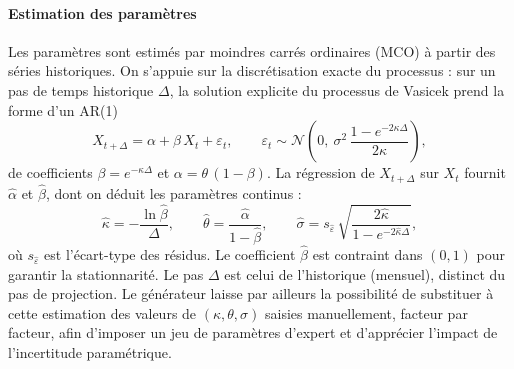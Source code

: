 \paragraph{Estimation des paramètres}
Les paramètres sont estimés par moindres carrés ordinaires (MCO) à partir des séries historiques. On s'appuie sur la discrétisation exacte du processus : sur un pas de temps historique $\Delta$, la solution explicite du processus de Vasicek prend la forme d'un AR(1)
\begin{equation}
    X_{t+\Delta} = \alpha + \beta\, X_t + \varepsilon_t,
    \qquad
    \varepsilon_t \sim \mathcal{N}\!\left(0,\ \sigma^2\,\frac{1-e^{-2\kappa\Delta}}{2\kappa}\right),
\end{equation}
de coefficients $\beta = e^{-\kappa\Delta}$ et $\alpha = \theta\,(1-\beta)$. La régression de $X_{t+\Delta}$ sur $X_t$ fournit $\hat{\alpha}$ et $\hat{\beta}$, dont on déduit les paramètres continus :
\begin{equation}
    \hat{\kappa} = -\frac{\ln\hat{\beta}}{\Delta},
    \qquad
    \hat{\theta} = \frac{\hat{\alpha}}{1-\hat{\beta}},
    \qquad
    \hat{\sigma} = s_{\hat{\varepsilon}}\,\sqrt{\frac{2\hat{\kappa}}{1-e^{-2\hat{\kappa}\Delta}}},
\end{equation}
où $s_{\hat{\varepsilon}}$ est l'écart-type des résidus. Le coefficient $\hat{\beta}$ est contraint dans $(0,1)$ pour garantir la stationnarité. Le pas $\Delta$ est celui de l'historique (mensuel), distinct du pas de projection. Le générateur laisse par ailleurs la possibilité de substituer à cette estimation des valeurs de $(\kappa, \theta, \sigma)$ saisies manuellement, facteur par facteur, afin d'imposer un jeu de paramètres d'expert et d'apprécier l'impact de l'incertitude paramétrique.

